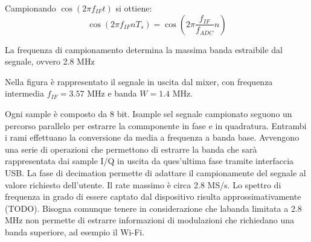 Campionando $\cos(2\pi f_{IF} t)$ si ottiene:
\[
    \cos(2\pi f_{IF} n T_s) = \cos(2\pi \frac{f_{IF}}{f_{ADC}} n)
\]

La frequenza di campionamento determina la massima banda estraibile dal segnale, ovvero 2.8 MHz

\begin{center}
\end{center}
Nella figura è rappresentato il segnale in uscita dal mixer, con frequenza intermedia $f_{IF} = 3.57$ MHz e banda $W = 1.4$ MHz.

Ogni sample è composto da 8 bit. Isample sel segnale campionato seguono un percorso parallelo per estrarre la commponente in fase e in quadratura. Entrambi i rami effettuano la conversione da media a frequenza a banda base.
Avvengono una serie di operazioni che permettono di estrarre la banda che sarà rappresentata dai sample I/Q in uscita da ques'ultima fase tramite interfaccia USB.
La fase di decimation permette di adattare il campionamente  del segnale al valore richiesto dell'utente. Il rate massimo è circa 2.8 MS/s.
Lo spettro di frequenza in grado di essere captato dal dispositivo risulta approssimativamente (TODO).
Bisogna comunque tenere in considerazione che labanda limitata a 2.8 MHz non permette di estrarre informazioni di modulazioni che richiedano una banda superiore, ad esempio il Wi-Fi.


